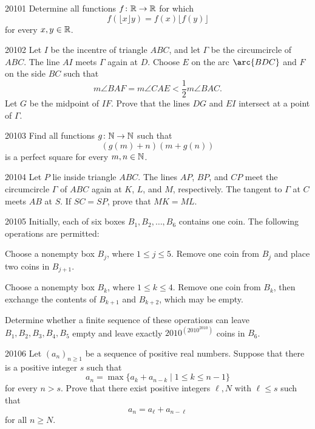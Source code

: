 
\begin{problem}{2010}{1}
Determine all functions $f\colon\mathbb{R}\to\mathbb{R}$ for which
\[
    f(\lfloor x\rfloor y)=f(x)\lfloor f(y)\rfloor
\]
for every $x, y\in\mathbb{R}$.
\end{problem}

\begin{problem}{2010}{2}
Let $I$ be the incentre of triangle $ABC$, and let $\Gamma$ be the circumcircle of $ABC$. The line $AI$ meets $\Gamma$ again at $D$. Choose $E$ on the arc $\arc{BDC}$ and $F$ on the side $BC$ such that
\[
    m\angle BAF=m\angle CAE<\frac12 m\angle BAC.
\]
Let $G$ be the midpoint of $IF$. Prove that the lines $DG$ and $EI$ intersect at a point of $\Gamma$.
\end{problem}

\begin{problem}{2010}{3}
Find all functions $g\colon\mathbb{N}\to\mathbb{N}$ such that
\[
    (g(m)+n)(m+g(n))
\]
is a perfect square for every $m, n\in\mathbb{N}$.
\end{problem}

\begin{problem}{2010}{4}
Let $P$ lie inside triangle $ABC$. The lines $AP$, $BP$, and $CP$ meet the circumcircle $\Gamma$ of $ABC$ again at $K$, $L$, and $M$, respectively. The tangent to $\Gamma$ at $C$ meets $AB$ at $S$. If $SC=SP$, prove that $MK=ML$.
\end{problem}

\begin{problem}{2010}{5}
Initially, each of six boxes $B_1, B_2, \dots, B_6$ contains one coin. The following operations are permitted:
\begin{problemchoices}
    \item Choose a nonempty box $B_j$, where $1\leq j\leq5$. Remove one coin from $B_j$ and place two coins in $B_{j+1}$.
    \item Choose a nonempty box $B_k$, where $1\leq k\leq4$. Remove one coin from $B_k$, then exchange the contents of $B_{k+1}$ and $B_{k+2}$, which may be empty.
\end{problemchoices}
Determine whether a finite sequence of these operations can leave $B_1, B_2, B_3, B_4, B_5$ empty and leave exactly $2010^{(2010^{2010})}$ coins in $B_6$.
\end{problem}

\begin{problem}{2010}{6}
Let $(a_n)_{n\geq1}$ be a sequence of positive real numbers. Suppose that there is a positive integer $s$ such that
\[
    a_n=\max\{a_k+a_{n-k}\mid1\leq k\leq n-1\}
\]
for every $n>s$. Prove that there exist positive integers $\ell, N$ with $\ell\leq s$ such that
\[
    a_n=a_\ell+a_{n-\ell}
\]
for all $n\geq N$.
\end{problem}
